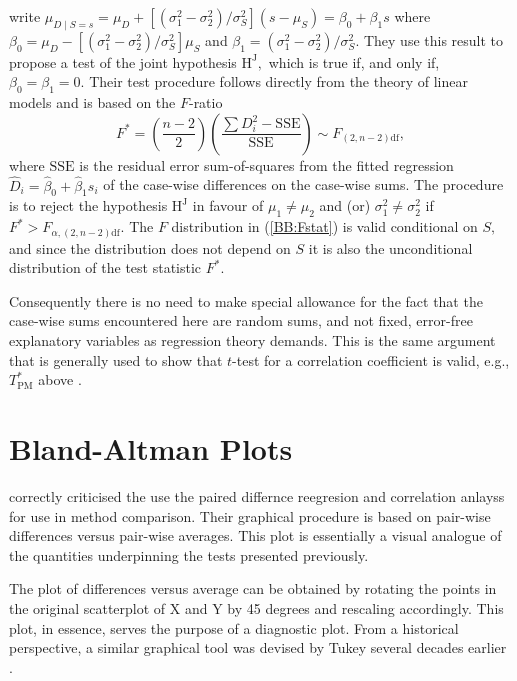 \documentclass[12pt, a4paper]{report}
\theoremstyle{plain}
\theoremstyle{definition}
\theoremstyle{remark}
\begin{document}
\cite{BB89} write $\mu_{D \mid S=s} = \mu_D + [ ( \sigma^2_1 - \sigma^2_2) / \sigma^2_S ] (s - \mu_S) = \beta_0 + \beta_1 s$ where $\beta_0=\mu_D- [(\sigma^2_1-\sigma^2_2)/ \sigma^2_S] \mu_S$ and $\beta_1 = (\sigma^2_1 - \sigma^2_2 )/ \sigma^2_S.$ They use this result to propose a test of the joint hypothesis $\textrm{H}^\mathrm{J},$ which is true if, and only if, $\beta_0=\beta_1=0.$ Their test procedure follows directly from the theory of linear models \citep[for example]{Hogg} and is based on the $F$-ratio
\begin{equation}\label{BB:Fstat}
F^* = (\frac{n-2}{2}) (\frac{\sum {D_i^2} - \mathrm{SSE}}{\mathrm{SSE}}) \sim F_{(2,n-2)\textrm{df}} ,
\end{equation}
where $\mathrm{SSE}$ is the residual error sum-of-squares from the fitted regression $\hat{D}_i=\hat{\beta}_0 +\hat{\beta}_1 s_i$ of the case-wise differences on the case-wise sums. The procedure is to reject the hypothesis $\textrm{H}^\mathrm{J}$ in favour of $\mu_1\neq\mu_2$ and (or) $\sigma^2_1\neq\sigma^2_2$ if $F^* >  F_{\alpha,(2,n-2)\textrm{df}}.$ The $F$ distribution in (\ref{BB:Fstat}) is valid conditional on $S,$ and since the distribution does not depend on $S$ it is also the unconditional distribution of the test statistic $F^*.$ 

Consequently there is no need to make special allowance for the fact that the case-wise sums encountered here are random sums, and not fixed, error-free explanatory variables as regression theory demands. This is the same argument that is generally used to show that $t$-test for a correlation coefficient is valid, e.g., $T^*_\mathrm{PM}$ above \citep[page 499]{Hogg}.




\section*{Bland-Altman Plots}

\citet{BA83} correctly criticised the use the paired differnce reegresion and correlation anlayss for use in method comparison. Their graphical procedure is based on pair-wise differences versus pair-wise averages. This plot is essentially a visual analogue of the quantities underpinning the tests presented previously.



The plot of differences versus average can be obtained by rotating the points in the original scatterplot of X and Y by 45 degrees and rescaling accordingly. This plot, in essence, serves the purpose of a diagnostic plot.
From a historical perspective, a similar graphical tool was devised by Tukey several decades earlier \citet{kozak2014including}.
\end{document}

